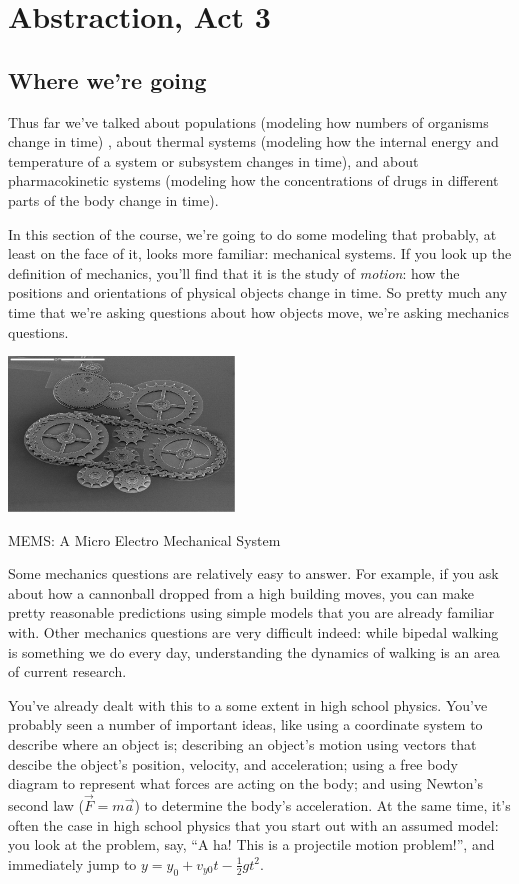 
\chapter{Abstraction, Act 3}

\section{Where we're going}

Thus far we've talked about populations (modeling how numbers of organisms change in time) , about thermal systems (modeling how the internal energy and temperature of a system or subsystem changes in time), and about pharmacokinetic systems (modeling how the concentrations of drugs in different parts of the body change in time).

In this section of the course, we're going to do some modeling that probably, at least on the face of it, looks more familiar:  mechanical systems.  If you look up the definition of mechanics, you'll find that it is the study of {\it motion}: how the positions and orientations of physical objects change in time.  So pretty much any time that we're asking questions about how objects move, we're asking mechanics questions.  

\begin{marginfigure}
\includegraphics[width=6cm]{figs/MEMS}
\caption{MEMS: A Micro Electro Mechanical System}
\end{marginfigure}

Some mechanics questions are relatively easy to answer.  For example, if you ask about how a cannonball dropped from a high building moves, you can make pretty reasonable predictions using simple models that you are already familiar with.  Other mechanics questions are very difficult indeed:  while bipedal walking is something we do every day, understanding the dynamics of walking is an area of current research. 

You've already dealt with this to a some extent in high school physics.  You've probably seen a number of important ideas, like using a coordinate system to describe where an object is;
describing an object's motion using vectors that descibe the object's position, velocity, and acceleration;
using a free body diagram to represent what forces are acting on the body;
 and using Newton's second law ($\vec{F} = m\vec{a}$) to determine the body's acceleration.  At the same time, it's often the case in high school physics that you start out with an assumed model:  you look at the problem, say, ``A ha!  This is a projectile motion problem!'', and immediately jump to $y = y_0 + v_{y0} t - \frac{1}{2} g t^2$.


